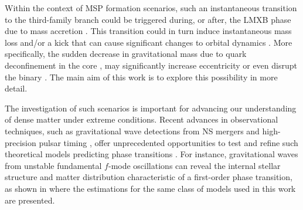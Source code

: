 \documentclass[main.tex]{subfiles}
\begin{document}
    Within the context of MSP formation scenarios, such an instantaneous transition to the third-family branch could be
    triggered during, or after, the LMXB phase due to mass accretion \citep[see, e.g.,][]
    {Bejger:2016emu,Alvarez-Castillo:2019apz}. This transition could in turn induce instantaneous mass loss and/or a kick that can cause significant changes to orbital dynamics \citep{Jiang:apj15}. 
    More specifically, the sudden decrease in gravitational mass due to quark deconfinement in the core \citep[owing to the 
    ``catastrophic rearrangement'' and strong compactification of matter when transitioning to the third-family branch which 
    increases the gravitational binding energy, see][]{Mishustin:2002xe}, may significantly increase eccentricity or even disrupt the binary \citep[see also][]{Jiang:raa2021}. The main aim of this work is to explore this possibility in more detail. 
    
    The investigation of such scenarios is important for advancing our understanding of dense matter under extreme conditions.  Recent advances in observational techniques, such as gravitational wave detections from NS mergers \citep[e.g.,][]{PhysRevLett.119.161101} and high-precision pulsar timing
    \citep[e.g.,][]{Miller:2019cac, Riley:2019yda,Miller:2021qha,Bogdanov:2021yip}, offer unprecedented opportunities to test and refine such theoretical models predicting phase transitions \citep[e.g.,][]{Bauswein:2022vtq}.
    For instance, gravitational waves from unstable fundamental $f$-mode oscillations can reveal the internal stellar
    structure and matter distribution characteristic of a first-order phase transition, as shown in \cite{2023arXiv230908775K} 
    where the estimations for the same class of models used in this work are presented. 
    
\end{document}
